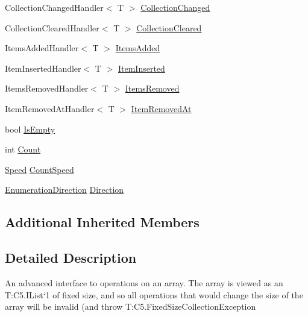 \begin{DoxyCompactItemize}
Collection\+Changed\+Handler$<$ T $>$ \hyperlink{class_c5_1_1_wrapped_array_a6af225122edd40486f4ca2a18ebd1cfb}{Collection\+Changed}
\item 
Collection\+Cleared\+Handler$<$ T $>$ \hyperlink{class_c5_1_1_wrapped_array_a8d1f8c80e700327151c71f8c37266d5f}{Collection\+Cleared}
\item 
Items\+Added\+Handler$<$ T $>$ \hyperlink{class_c5_1_1_wrapped_array_ad4e9059009c3f36ac2a898424e8a07f0}{Items\+Added}
\item 
Item\+Inserted\+Handler$<$ T $>$ \hyperlink{class_c5_1_1_wrapped_array_a2a153b5a67a39f2d05e987e447bd9352}{Item\+Inserted}
\item 
Items\+Removed\+Handler$<$ T $>$ \hyperlink{class_c5_1_1_wrapped_array_a2589ac72276da70bbf0e341826d29f5a}{Items\+Removed}
\item 
Item\+Removed\+At\+Handler$<$ T $>$ \hyperlink{class_c5_1_1_wrapped_array_a76779191e9851ed03c5313157bb41a62}{Item\+Removed\+At}
\item 
bool \hyperlink{class_c5_1_1_wrapped_array_a63eafa18bd9e15b9f9c606d64500d851}{Is\+Empty}
\item 
int \hyperlink{class_c5_1_1_wrapped_array_a91d0f21ce4b41fc4a5554d2d4cf92245}{Count}
\item 
\hyperlink{namespace_c5_a615ba88dcdaa8d5a3c5f833a73d7fad6}{Speed} \hyperlink{class_c5_1_1_wrapped_array_afd19afac8b14529a8cc700e075bb0169}{Count\+Speed}
\item 
\hyperlink{namespace_c5_aad282676794e49130eb8caed289395f8}{Enumeration\+Direction} \hyperlink{class_c5_1_1_wrapped_array_acf6e4074f7740cf342cc7dba804ef1da}{Direction}
\end{DoxyCompactItemize}
\subsection*{Additional Inherited Members}


\subsection{Detailed Description}
An advanced interface to operations on an array. The array is viewed as an T\+:\+C5.\+I\+List`1 of fixed size, and so all operations that would change the size of the array will be invalid (and throw T\+:\+C5.\+Fixed\+Size\+Collection\+Exception 


